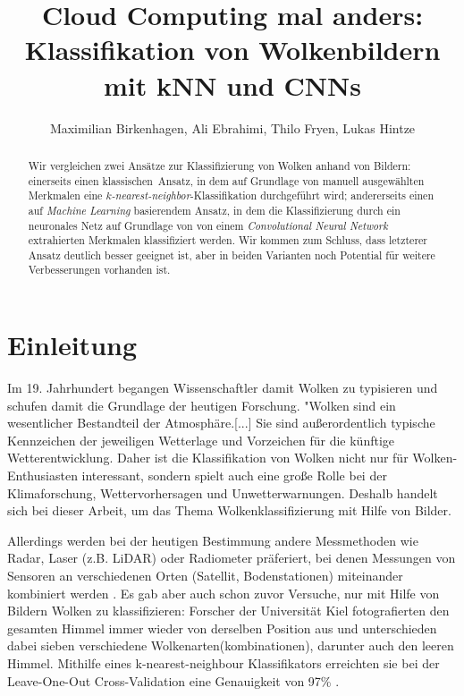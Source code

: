 \documentclass[a4,german]{article}
\begin{document}
\title{Cloud Computing mal anders: Klassifikation von Wolkenbildern mit kNN und CNNs}
\author{Maximilian Birkenhagen, Ali Ebrahimi, Thilo Fryen, Lukas Hintze}
\maketitle

\begin{abstract}
    Wir vergleichen zwei Ansätze zur Klassifizierung von Wolken anhand von Bildern:
        einerseits einen \glqq klassischen\grqq\ Ansatz, in dem auf Grundlage von manuell ausgewählten Merkmalen eine \emph{$k$-nearest-neighbor}-Klassifika\-tion durchgeführt wird;
        andererseits einen auf \emph{Machine Learning} basierendem Ansatz, in dem die Klassifizierung durch ein neuronales Netz auf Grundlage von von einem \emph{Convolutional Neural Network} extrahierten Merkmalen klassifiziert werden.
    Wir kommen zum Schluss, dass letzterer Ansatz deutlich besser geeignet ist, aber in beiden Varianten noch Potential für weitere Verbesserungen vorhanden ist.
\end{abstract}

\section{Einleitung}

Im 19. Jahrhundert begangen Wissenschaftler damit Wolken zu typisieren und schufen damit die Grundlage der heutigen Forschung.
"Wolken sind ein wesentlicher Bestandteil der Atmosphäre.[...] Sie sind außerordentlich typische Kennzeichen der jeweiligen Wetterlage und Vorzeichen für die künftige Wetterentwicklung.\cite{wolkenatlas:Karlsruhe}
Daher ist die Klassifikation von Wolken nicht nur für Wolken-Enthusiasten interessant, sondern spielt auch eine große Rolle bei der Klimaforschung, Wettervorhersagen und Unwetterwarnungen.
Deshalb handelt sich bei dieser Arbeit, um das Thema Wolkenklassifizierung mit Hilfe von Bilder.

Allerdings werden bei der heutigen Bestimmung andere Messmethoden wie Radar, Laser (z.B. LiDAR) oder Radiometer präferiert, bei denen Messungen von Sensoren an verschiedenen Orten (Satellit, Bodenstationen) miteinander kombiniert werden \cite{wang}.
Es gab aber auch schon zuvor Versuche, nur mit Hilfe von Bildern Wolken zu klassifizieren:
Forscher der Universität Kiel fotografierten den gesamten Himmel immer wieder von derselben Position aus und unterschieden dabei sieben verschiedene Wolkenarten(kombinationen), darunter auch den \glqq leeren Himmel\grqq.
Mithilfe eines k-nearest-neighbour Klassifikators erreichten sie bei der Leave-One-Out Cross-Validation eine Genauigkeit von 97\% \cite{heinle}.
\end{document}

